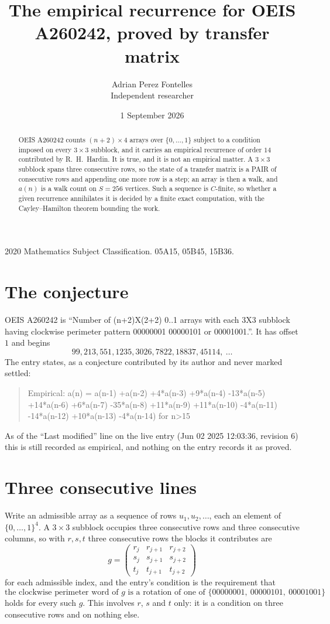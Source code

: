 \documentclass[11pt,a4paper]{article}
\title{The empirical recurrence for OEIS A260242, proved by transfer matrix}
\author{Adrian Perez Fontelles\\ \small Independent researcher}
\date{1 September 2026}
\theoremstyle{plain}
\theoremstyle{definition}
\begin{document}
\maketitle

\begin{abstract}
OEIS A260242 counts $(n+2)\times4$ arrays over $\{0,\dots,1\}$ subject to a condition imposed on
every $3\times3$ subblock, and it carries an empirical recurrence of order $14$
contributed by R.~H.~Hardin. It is true, and it is not an empirical matter. A $3\times3$
subblock spans three consecutive rows, so the state of a transfer matrix is a PAIR of
consecutive rows and appending one more row is a step; an array is then a walk, and
$a(n)$ is a walk count on $S=256$ vertices. Such a sequence is $C$-finite, so whether a given
recurrence annihilates it is decided by a finite exact computation, with the Cayley--Hamilton
theorem bounding the work.
\end{abstract}

\noindent\small 2020 Mathematics Subject Classification. 05A15, 05B45, 15B36.\normalsize

\section{The conjecture}

OEIS A260242 is ``Number of (n+2)X(2+2) 0..1 arrays with each 3X3 subblock having clockwise perimeter pattern 00000001 00000101 or 00001001.''. It has offset $1$ and begins
\[
99, 213, 551, 1235, 3026, 7822, 18837, 45114,\ \dots
\]
The entry states, as a conjecture contributed by its author and never marked settled:
\begin{quote}
Empirical: a(n) = a(n-1) +a(n-2) +4*a(n-3) +9*a(n-4) -13*a(n-5) +14*a(n-6) +6*a(n-7) -35*a(n-8) +11*a(n-9) +11*a(n-10) -4*a(n-11) -14*a(n-12) +10*a(n-13) -4*a(n-14) for n>15
\end{quote}
As of the ``Last modified'' line on the live entry (Jun 02 2025 12:03:36, revision 6) this is still
recorded as empirical, and nothing on the entry records it as proved.

\section{Three consecutive lines}

Write an admissible array as a sequence of rows $u_1,u_2,\dots$, each an element of
$\{0,\dots,1\}^{4}$. A $3\times3$ subblock occupies three consecutive rows and
three consecutive columns, so with $r,s,t$ three consecutive rows the blocks it
contributes are
\[
g=\begin{pmatrix}r_j&r_{j+1}&r_{j+2}\\ s_j&s_{j+1}&s_{j+2}\\ t_j&t_{j+1}&t_{j+2}\end{pmatrix}
\]
for each admissible index, and the entry's condition is the requirement that
\[
\text{the clockwise perimeter word of }g\text{ is a rotation of one of }\{00000001,\ 00000101,\ 00001001\}
\]
holds for every such $g$. This involves $r$, $s$ and $t$ only: it is a condition on
three consecutive rows and on nothing else.
\end{document}
